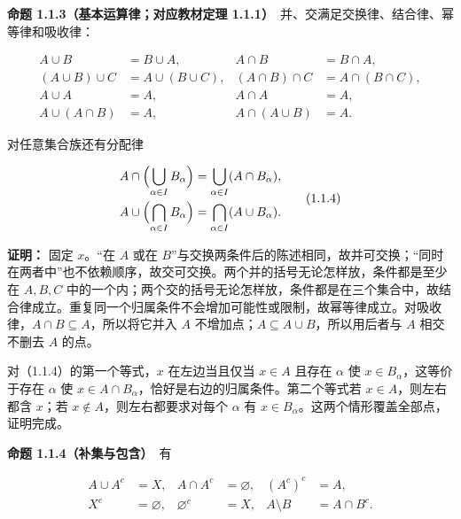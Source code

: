 \documentclass[11pt,a4paper]{article}
\begin{document}
\textbf{命题 1.1.3（基本运算律；对应教材定理
1.1.1）}　并、交满足交换律、结合律、幂等律和吸收律：

\begin{equation*}
\begin{aligned}
A\cup B&=B\cup A,& A\cap B&=B\cap A,\\
(A\cup B)\cup C&=A\cup(B\cup C),&
(A\cap B)\cap C&=A\cap(B\cap C),\\
A\cup A&=A,&A\cap A&=A,\\
A\cup(A\cap B)&=A,&A\cap(A\cup B)&=A.
\end{aligned}\tag{1.1.3}
\end{equation*}

对任意集合族还有分配律

\begin{equation*}
\begin{aligned}
A\cap\Bigl(\bigcup_{\alpha\in I}B_\alpha\Bigr)
 &=\bigcup_{\alpha\in I}(A\cap B_\alpha),\\
A\cup\Bigl(\bigcap_{\alpha\in I}B_\alpha\Bigr)
 &=\bigcap_{\alpha\in I}(A\cup B_\alpha).
\end{aligned}\tag{1.1.4}
\end{equation*}

\textbf{证明：} 固定 \(x\)。``在 \(A\) 或在
\(B\)''与交换两条件后的陈述相同，故并可交换；``同时在两者中''也不依赖顺序，故交可交换。两个并的括号无论怎样放，条件都是至少在
\(A,B,C\)
中的一个内；两个交的括号无论怎样放，条件都是在三个集合中，故结合律成立。重复同一个归属条件不会增加可能性或限制，故幂等律成立。对吸收律，\(A\cap B\subseteq A\)，所以将它并入
\(A\) 不增加点；\(A\subseteq A\cup B\)，所以用后者与 \(A\) 相交不删去
\(A\) 的点。

对（1.1.4）的第一个等式，\(x\) 在左边当且仅当 \(x\in A\) 且存在
\(\alpha\) 使 \(x\in B_\alpha\)，这等价于存在 \(\alpha\) 使
\(x\in A\cap B_\alpha\)，恰好是右边的归属条件。第二个等式若
\(x\in A\)，则左右都含 \(x\)；若 \(x\notin A\)，则左右都要求对每个
\(\alpha\) 有 \(x\in B_\alpha\)。这两个情形覆盖全部点，证明完成。

\textbf{命题 1.1.4（补集与包含）}　有

\begin{equation*}
\begin{aligned}
A\cup A^c&=X,&A\cap A^c&=\varnothing,&(A^c)^c&=A,\\
X^c&=\varnothing,&\varnothing^c&=X,&A\setminus B&=A\cap B^c.
\end{aligned}\tag{1.1.5}
\end{equation*}
\end{document}
